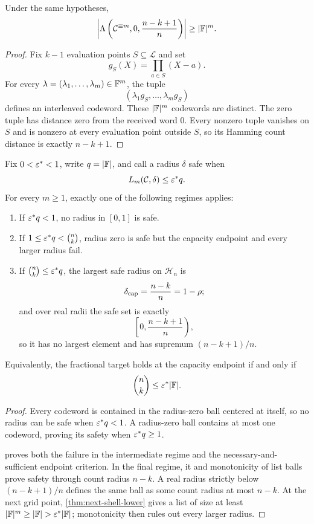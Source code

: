 \begin{theorem}
\label{thm:next-shell-lower}
Under the same hypotheses,
\[
  \left|
    \Lambda\left(
      \mathcal C^{\equiv m},
      0,
      \frac{n-k+1}{n}
    \right)
  \right|
  \ge |\mathbb{F}|^m .
\]
\end{theorem}

\begin{proof}
Fix \(k-1\) evaluation points \(S\subseteq\mathcal L\) and set
\[
  g_S(X)=\prod_{a\in S}(X-a).
\]
For every \(\lambda=(\lambda_1,\ldots,\lambda_m)\in\mathbb{F}^m\), the tuple
\[
  (\lambda_1g_S,\ldots,\lambda_mg_S)
\]
defines an interleaved codeword.  These \(|\mathbb{F}|^m\) codewords are distinct.
The zero tuple has distance zero from the received word \(0\). Every nonzero
tuple vanishes on \(S\) and is nonzero at every evaluation point outside
\(S\), so its Hamming count distance is exactly \(n-k+1\).
\end{proof}

\begin{theorem}
\label{thm:fractional-phase-split}
Fix \(0<\varepsilon^\ast<1\), write \(q=|\mathbb{F}|\), and call a radius \(\delta\)
safe when
\[
  L_m(\mathcal C,\delta)\le\varepsilon^\ast q.
\]
For every \(m\ge1\), exactly one of the following regimes applies:
\begin{enumerate}[label=(\roman*)]
  \item If \(\varepsilon^\ast q<1\), no radius in \([0,1]\) is safe.
  \item If
    \(1\le\varepsilon^\ast q<\binom nk\), radius zero is safe but the capacity
    endpoint and every larger radius fail.
  \item If \(\binom nk\le\varepsilon^\ast q\), the largest safe radius on
    \(\mathcal H_n\) is
    \[
      \delta_{\mathrm{cap}}=\frac{n-k}{n}=1-\rho;
    \]
    and over real radii the safe set is exactly
    \[
      \left[0,\frac{n-k+1}{n}\right),
    \]
    so it has no largest element and has supremum
    \((n-k+1)/n\).
 \end{enumerate}
Equivalently, the fractional target holds at the capacity endpoint if and
only if
\[
  \binom nk\le\varepsilon^\ast|\mathbb{F}|.
\]
\end{theorem}

\begin{proof}
Every codeword is contained in the radius-zero ball centered at itself, so no
radius can be safe when \(\varepsilon^\ast q<1\).  A radius-zero ball contains at most
one codeword, proving its safety when \(\varepsilon^\ast q\ge1\).

 proves both the failure in the intermediate
regime and the necessary-and-sufficient endpoint criterion.  In the final
regime, it and monotonicity of list balls prove safety through count radius
\(n-k\).  A real radius strictly below
\((n-k+1)/n\) defines the same ball as some count radius at most \(n-k\).
At the next grid point, \cref{thm:next-shell-lower} gives a list of size at
least \(|\F|^m\ge|\F|>\epsstar|\F|\); monotonicity then rules out every
larger radius.
\end{proof}

